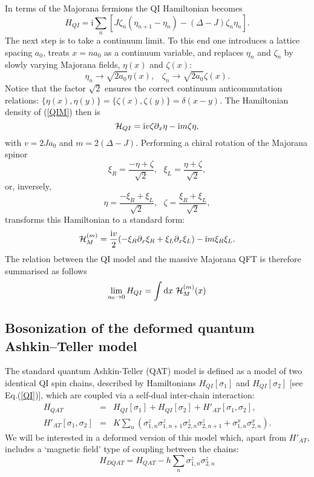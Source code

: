 In terms of the Majorana fermions the QI Hamiltonian
becomes
\begin{equation}
H_{QI}= \mbox{i} \sum\limits_n\left[J\zeta_n(\eta_{n+1}-\eta_n)- (\Delta - J)\zeta_n\eta_n\right].
\label{QIM}
\end{equation}
The next step is to take a continuum limit.
To this end one introduces a lattice
spacing $a_0$, treats $x=na_0$ as a continuum
variable, and replaces $\eta_n$ and $\zeta_n$ by slowly varying Majorana fields,
$\eta (x)$ and $\zeta (x)$:
\[
\eta_n \to \sqrt{2a_0} \eta(x),\;\;\;
\zeta_n \to \sqrt{2a_0} \zeta(x).
\]
Notice that the factor $\sqrt{2}$ ensures the correct
continuum anticommutation relations:
$\{\eta(x),\eta(y)\}= \{\zeta(x),\zeta(y) \}
= \delta(x-y)$. The Hamiltonian density of (\ref{QIM}) then is
\[
{\cal{H}}_{QI} = \mbox{i} v \zeta\partial_x\eta- \mbox{i} m\zeta\eta,
\]
with $v=2Ja_0$ and $m=2(\Delta-J)$.
Performing a chiral rotation of the Majorana spinor
\begin{equation}
\xi_R = \frac{- \eta + \zeta}{\sqrt{2}}, ~~~
\xi_L = \frac{\eta + \zeta}{\sqrt{2}}, \label{chiral-rot1}
\end{equation}
or, inversely,
\begin{equation}
\eta = \frac{- \xi_R + \xi_L}{\sqrt{2}}, ~~~
\zeta = \frac{\xi_R + \xi_L}{\sqrt{2}},\label{chiral-rot2}
\end{equation}
transforms this Hamiltonian to a standard form:
\begin{equation}
{\cal{H}}^{(m)}_M=\frac{\mbox{i} v}{2}(-\xi_R\partial_x\xi_R+\xi_L\partial_x\xi_L)
-\mbox{i} m\xi_R\xi_L.
\label{Mfree}
\end{equation}
The relation between the QI model and the massive Majorana
QFT
is therefore summarised as follows
\begin{equation}
\lim\limits_{a_0\to 0}H_{QI}=\int \mbox{d} x~ {\cal{H}}^{(m)}_M (x)
\label{QIvsM}
\end{equation}

\subsection{Bosonization of the deformed quantum Ashkin--Teller model}

The standard quantum Ashkin-Teller (QAT) model is defined as a model
of two identical QI spin chains, described by Hamiltonians
$H_{QI}[\sigma_1]$ and $H_{QI}[\sigma_2]$ [see Eq.(\ref{QI})],
which are coupled via a self-dual inter-chain interaction:
\begin{eqnarray}
H_{QAT}&=&H_{QI}[\sigma_1]+H_{QI}[\sigma_2]+H'_{AT}[\sigma_1,\sigma_2],\label{QAT}\\
H'_{AT}[\sigma_1,\sigma_2]&=&K\sum\limits_n
\left(\sigma^z_{1,n}\sigma^z_{1,n+1}\sigma^z_{2,n}\sigma^z_{2,n+1}+
\sigma^x_{1,n}\sigma^x_{2,n}\right).
\label{QATint}
\end{eqnarray}
We will be interested in a deformed version of this model
which, apart from $H'_{AT}$, includes a
`magnetic field' type of coupling between the chains:
\begin{equation}
H_{DQAT} = H_{QAT} - h\sum\limits_n \sigma^z_{1,n}\sigma^z_{2,n}
\label{DQAT}
\end{equation}

